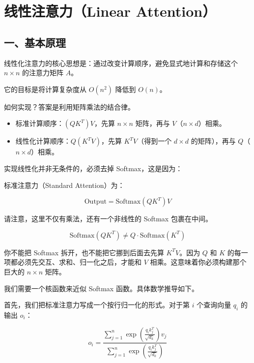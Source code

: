 \setcounter{section}{7}

\hypertarget{ux7ebfux6027ux6ce8ux610fux529blinear-attention}{%
\section{线性注意力（Linear Attention）}\label{ux7ebfux6027ux6ce8ux610fux529blinear-attention}}

\hypertarget{ux4e00ux57faux672cux539fux7406-1}{%
\subsection{一、基本原理}\label{ux4e00ux57faux672cux539fux7406-1}}

线性化注意力的核心思想是：通过改变计算顺序，避免显式地计算和存储这个 \(n \times n\) 的注意力矩阵 \(A\)。

它的目标是将计算复杂度从 \(O(n^2)\) 降低到 \(O(n)\)。

如何实现？答案是利用矩阵乘法的结合律。

\begin{itemize}
\tightlist
\item
  标准计算顺序：\((QK^T)V\)，先算 \(n \times n\) 矩阵，再与 \(V\)（\(n \times d\)）相乘。
\item
  线性化计算顺序：\(Q(K^T V)\)，先算 \(K^T V\)（得到一个 \(d \times d\) 的矩阵），再与 \(Q\)（\(n \times d\)）相乘。
\end{itemize}

实现线性化并非无条件的，必须去掉 Softmax，这是因为：

标准注意力（Standard Attention）为：

\[
\mathrm{Output} = \mathrm{Softmax}(QK^T)V
\]

请注意，这里不仅有乘法，还有一个非线性的 Softmax 包裹在中间。

\[
\mathrm{Softmax}(QK^T) \ne Q \cdot \mathrm{Softmax}(K^T)
\]

你不能把 Softmax 拆开，也不能把它挪到后面去先算 \(K^T V\)。因为 \(Q\) 和 \(K\) 的每一项都必须先交互、求和、归一化之后，才能和 \(V\) 相乘。这意味着你必须构建那个巨大的 \(n \times n\) 矩阵。

我们需要一个核函数来近似 Softmax 函数。具体数学推导如下。

首先，我们把标准注意力写成一个按行归一化的形式。对于第 \(i\) 个查询向量 \(q_i\) 的输出 \(o_i\)：

\[
o_i =
\frac{
\sum_{j=1}^{n} \exp\left(\frac{q_i k_j^T}{\sqrt{d_k}}\right)v_j
}{
\sum_{j=1}^{n} \exp\left(\frac{q_i k_j^T}{\sqrt{d_k}}\right)
}
\]

